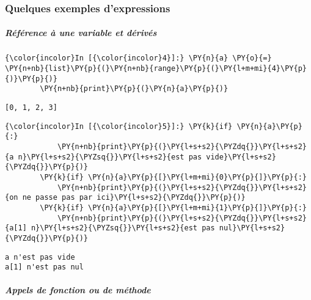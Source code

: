     \hypertarget{quelques-exemples-dexpressions}{%
\subsubsection{Quelques exemples
d'expressions}\label{quelques-exemples-dexpressions}}

    \hypertarget{ruxe9fuxe9rence-uxe0-une-variable-et-duxe9rivuxe9s}{%
\subparagraph{Référence à une variable et
dérivés}\label{ruxe9fuxe9rence-uxe0-une-variable-et-duxe9rivuxe9s}}

    \begin{Verbatim}[commandchars=\\\{\}]
{\color{incolor}In [{\color{incolor}4}]:} \PY{n}{a} \PY{o}{=} \PY{n+nb}{list}\PY{p}{(}\PY{n+nb}{range}\PY{p}{(}\PY{l+m+mi}{4}\PY{p}{)}\PY{p}{)}
        \PY{n+nb}{print}\PY{p}{(}\PY{n}{a}\PY{p}{)}
\end{Verbatim}


    \begin{Verbatim}[commandchars=\\\{\}]
[0, 1, 2, 3]

    \end{Verbatim}

    \begin{Verbatim}[commandchars=\\\{\}]
{\color{incolor}In [{\color{incolor}5}]:} \PY{k}{if} \PY{n}{a}\PY{p}{:}
            \PY{n+nb}{print}\PY{p}{(}\PY{l+s+s2}{\PYZdq{}}\PY{l+s+s2}{a n}\PY{l+s+s2}{\PYZsq{}}\PY{l+s+s2}{est pas vide}\PY{l+s+s2}{\PYZdq{}}\PY{p}{)}
        \PY{k}{if} \PY{n}{a}\PY{p}{[}\PY{l+m+mi}{0}\PY{p}{]}\PY{p}{:}
            \PY{n+nb}{print}\PY{p}{(}\PY{l+s+s2}{\PYZdq{}}\PY{l+s+s2}{on ne passe pas par ici}\PY{l+s+s2}{\PYZdq{}}\PY{p}{)}
        \PY{k}{if} \PY{n}{a}\PY{p}{[}\PY{l+m+mi}{1}\PY{p}{]}\PY{p}{:}
            \PY{n+nb}{print}\PY{p}{(}\PY{l+s+s2}{\PYZdq{}}\PY{l+s+s2}{a[1] n}\PY{l+s+s2}{\PYZsq{}}\PY{l+s+s2}{est pas nul}\PY{l+s+s2}{\PYZdq{}}\PY{p}{)}
\end{Verbatim}


    \begin{Verbatim}[commandchars=\\\{\}]
a n'est pas vide
a[1] n'est pas nul

    \end{Verbatim}

    \hypertarget{appels-de-fonction-ou-de-muxe9thode}{%
\subparagraph{Appels de fonction ou de
méthode}\label{appels-de-fonction-ou-de-muxe9thode}}

